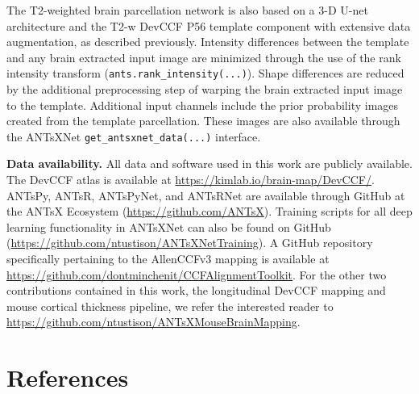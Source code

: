 \documentclass[
  12pt,
]{article}
\begin{document}
The T2-weighted brain parcellation network is also based on a 3-D U-net
architecture and the T2-w DevCCF P56 template component with extensive
data augmentation, as described previously. Intensity differences
between the template and any brain extracted input image are minimized
through the use of the rank intensity transform
(\texttt{ants.rank\_intensity(...)}). Shape differences are reduced by
the additional preprocessing step of warping the brain extracted input
image to the template. Additional input channels include the prior
probability images created from the template parcellation. These images
are also available through the ANTsXNet
\texttt{get\_antsxnet\_data(...)} interface.

\clearpage
\newpage

\textbf{Data availability.} All data and software used in this work are
publicly available. The DevCCF atlas is available at
\url{https://kimlab.io/brain-map/DevCCF/}. ANTsPy, ANTsR, ANTsPyNet, and
ANTsRNet are available through GitHub at the ANTsX Ecosystem
(\url{https://github.com/ANTsX}). Training scripts for all deep learning
functionality in ANTsXNet can also be found on GitHub
(\url{https://github.com/ntustison/ANTsXNetTraining}). A GitHub
repository specifically pertaining to the AllenCCFv3 mapping is
available at \url{https://github.com/dontminchenit/CCFAlignmentToolkit}.
For the other two contributions contained in this work, the longitudinal
DevCCF mapping and mouse cortical thickness pipeline, we refer the
interested reader to
\url{https://github.com/ntustison/ANTsXMouseBrainMapping}.

\clearpage

\hypertarget{references}{%
\section*{References}\label{references}}
\end{document}

